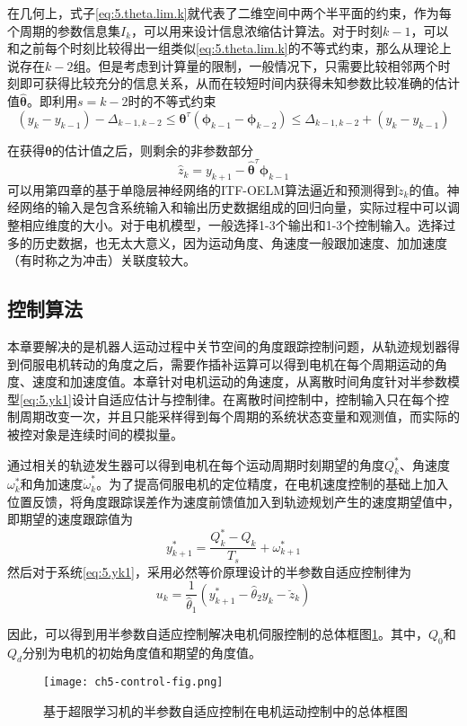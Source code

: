 在几何上，式子\eqref{eq:5.theta.lim.k}就代表了二维空间中两个半平面的约束，作为每个周期的参数信息集$I_{k}$，可以用来设计信息浓缩估计算法。对于时刻$k-1$，可以和之前每个时刻比较得出一组类似\eqref{eq:5.theta.lim.k}的不等式约束，那么从理论上说存在$k-2$组。但是考虑到计算量的限制，一般情况下，只需要比较相邻两个时刻即可获得比较充分的信息关系，从而在较短时间内获得未知参数比较准确的估计值$\hat{\bm{\theta}}$。即利用$s=k-2$时的不等式约束
\begin{equation}\label{eq:5.theta.lim.s}
(y_{k}-y_{k-1})-\Delta_{k-1,k-2}\leq\bm{\theta}^{\tau}(\bm{\phi}_{k-1}-\bm{\phi}_{k-2})\leq\Delta_{k-1,k-2}+(y_{k}-y_{k-1})
\end{equation}

在获得$\bm{\theta}$的估计值之后，则剩余的非参数部分
$$\hat{z}_{k}=y_{k+1}-\hat{\bm{\theta}}^{\tau}\bm{\phi}_{k-1}$$
可以用第四章的基于单隐层神经网络的ITF-OELM算法逼近和预测得到$\breve{z}_{k}$的值。神经网络的输入是包含系统输入和输出历史数据组成的回归向量，实际过程中可以调整相应维度的大小。对于电机模型，一般选择1-3个输出和1-3个控制输入。选择过多的历史数据，也无太大意义，因为运动角度、角速度一般跟加速度、加加速度（有时称之为冲击）关联度较大。

\subsection{控制算法}\label{5.2.3}
本章要解决的是机器人运动过程中关节空间的角度跟踪控制问题，从轨迹规划器得到伺服电机转动的角度之后，需要作插补运算可以得到电机在每个周期运动的角度、速度和加速度值。本章针对电机运动的角速度，从离散时间角度针对半参数模型\eqref{eq:5.yk1}设计自适应估计与控制律。在离散时间控制中，控制输入只在每个控制周期改变一次，并且只能采样得到每个周期的系统状态变量和观测值，而实际的被控对象是连续时间的模拟量。

通过相关的轨迹发生器可以得到电机在每个运动周期时刻期望的角度$Q_{k}^{*}$、角速度$\omega_{k}^{*}$和角加速度$\dot{\omega}_{k}^{*}$。为了提高伺服电机的定位精度，在电机速度控制的基础上加入位置反馈，将角度跟踪误差作为速度前馈值加入到轨迹规划产生的速度期望值中，即期望的速度跟踪值为
$$y_{k+1}^{*}=\frac{Q_{k}^{*}-Q_{k}}{T_{s}}+\omega_{k+1}^{*}$$
然后对于系统\ref{eq:5.yk1}，采用必然等价原理设计的半参数自适应控制律为
\begin{equation}\label{eq:5.uk}
u_{k} = \frac{1}{\hat{\theta}_{1}}(y^{*}_{k+1}-\hat{\theta}_{2}y_{k}-\breve{z}_{k})
\end{equation}

因此，可以得到用半参数自适应控制解决电机伺服控制的总体框图\ref{fig.control.motor}。其中，$Q_{0}$和$Q_{d}$分别为电机的初始角度值和期望的角度值。
\begin{figure}[!htb]
	\centering
	\texttt{[image: ch5-control-fig.png]}\\	 %
	\caption{基于超限学习机的半参数自适应控制在电机运动控制中的总体框图}
	\label{fig.control.motor}
\end{figure}

